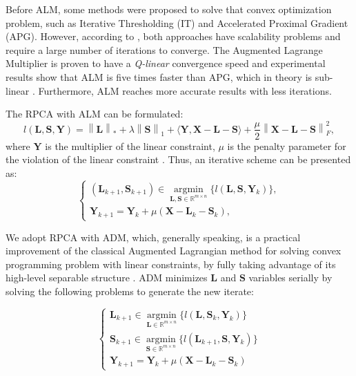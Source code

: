 Before ALM, some methods were proposed to solve that convex optimization problem, such as Iterative Thresholding (IT) and Accelerated Proximal Gradient (APG). However, according to \cite{lin2010augmented}, both approaches have scalability problems and require a large number of iterations to converge. The Augmented Lagrange Multiplier is proven to have a \emph{Q-linear} convergence speed and experimental results show that ALM is five times faster than APG, which in theory is sub-linear \cite{lin2010augmented}. Furthermore, ALM reaches more accurate results with less iterations.

The RPCA with ALM can be formulated:
\begin{equation}\label{eq:4.04}
	l(\boldsymbol{L}, \boldsymbol{S}, \boldsymbol{Y}) = \left\|\boldsymbol{L}\right\|_* + \lambda\left\|\boldsymbol{S}\right\|_1 + \langle \boldsymbol{Y, X - L - S}  \rangle + \frac{\mu}{2}\left\|\boldsymbol{X - L - S}\right\|_F^2,
\end{equation}
where $\boldsymbol{Y}$ is the multiplier of the linear constraint, $\mu$ is the penalty parameter for the violation of the linear constraint \cite{yuan2009sparse}. Thus, an iterative scheme can be presented as:
\begin{equation}\label{eq:4.05}
	\left\{
		\begin{matrix} 
			(\boldsymbol{L}_{k+1}, \boldsymbol{S}_{k+1}) \in \operatorname*{argmin}_{\boldsymbol{L,S} \in \mathbb{R}^{m \times n}} \{l(\boldsymbol{L}, \boldsymbol{S}, \boldsymbol{Y}_{k})\}, \\ 
			\boldsymbol{Y}_{k+1} = \boldsymbol{Y}_{k} + \mu(\boldsymbol{X} - \boldsymbol{L}_{k} - \boldsymbol{S}_{k}),
		\end{matrix}
	\right.
\end{equation}

We adopt RPCA with ADM, which, generally speaking, is a practical improvement of the classical Augmented Lagrangian method for solving convex programming problem with linear constraints, by fully taking advantage of its high-level separable structure \cite{yuan2009sparse}. ADM minimizes $\boldsymbol{L}$ and $\boldsymbol{S}$ variables serially by solving the following problems to generate the new iterate:

\begin{equation}\label{eq:4.06}
	\left\{\begin{matrix}
	\boldsymbol{L}_{k+1} \in \operatorname*{argmin}_{\boldsymbol{L} \in \mathbb{R}^{m \times n}}\{l(\boldsymbol{L}, \boldsymbol{S}_{k}, \boldsymbol{Y}_{k})\}\\ 
	\boldsymbol{S}_{k+1} \in \operatorname*{argmin}_{\boldsymbol{S} \in \mathbb{R}^{m \times n}}\{l(\boldsymbol{L}_{k+1}, \boldsymbol{S}, \boldsymbol{Y}_{k})\}\\ 
	\boldsymbol{Y}_{k+1} = \boldsymbol{Y}_{k} + \mu(\boldsymbol{X} - \boldsymbol{L}_{k} - \boldsymbol{S}_{k})
	\end{matrix}\right.
\end{equation}

